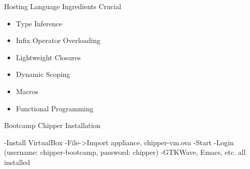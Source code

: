 \documentclass[xcolor=pdflatex,dvipsnames,table]{beamer}
\begin{document}
% 

\begin{frame}[fragile]{Hosting Language Ingredients}
Crucial
\begin{itemize}
\item Type Inference
\item Infix Operator Overloading
\item Lightweight Closures
\item Dynamic Scoping
\item Macros
\item Functional Programming
\end{itemize}
\end{frame}

\begin{frame}[fragile]{Bootcamp Chipper Installation}
\begin{stanza}
-Install VirtualBox
-File->Import appliance, chipper-vm.ova
-Start
-Login (username: chipper-bootcamp, password: chipper)
-GTKWave, Emacs, etc. all installed
\end{stanza}
\end{frame}
\end{document}
